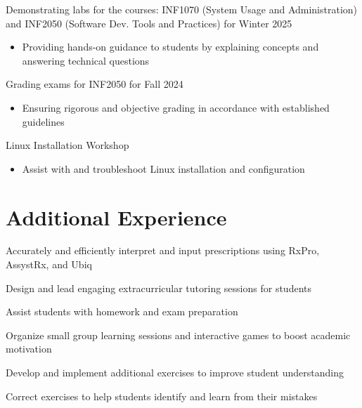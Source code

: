 \documentclass[letterpaper,10pt]{article}
\begin{document}
  \begin{resume_list}
    \item Demonstrating labs for the courses: INF1070 (System Usage and Administration) and INF2050 (Software Dev. Tools and Practices) for Winter 2025
    \begin{itemize}
    \item{Providing hands-on guidance to students by explaining concepts and answering technical questions}
    \end{itemize}
    \vspace{3pt}
    \item Grading exams for INF2050 for Fall 2024
    \begin{itemize}
    \item{Ensuring rigorous and objective grading in accordance with established guidelines}
    \end{itemize}
    \item Linux Installation Workshop
    \begin{itemize}
    \item{Assist with and troubleshoot Linux installation and configuration}
    \end{itemize}
  \end{resume_list}

   \section{Additional Experience}

  \begin{resume_list}
    \item Accurately and efficiently interpret and input prescriptions using RxPro, AssystRx, and Ubiq
  \end{resume_list}

  \begin{resume_list}
    \item Design and lead engaging extracurricular tutoring sessions for students
    \item Assist students with homework and exam preparation
    \item Organize small group learning sessions and interactive games to boost academic motivation
    \item Develop and implement additional exercises to improve student understanding
    \item Correct exercises to help students identify and learn from their mistakes
  \end{resume_list}
\end{document}
